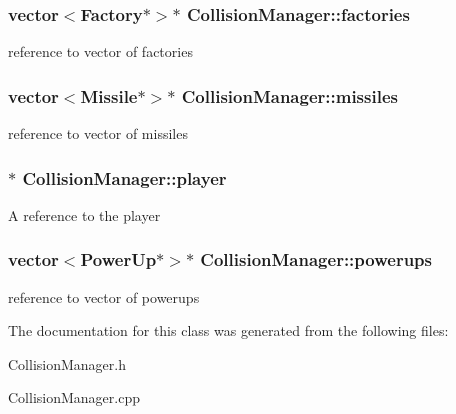 \subsubsection[{\texorpdfstring{factories}{factories}}]{\setlength{\rightskip}{0pt plus 5cm}vector$<${\bf Factory}$\ast$$>$$\ast$ Collision\+Manager\+::factories\hspace{0.3cm}{\ttfamily [private]}}\hypertarget{class_collision_manager_ad46ec3ec145aeacb4446ad42797964cd}{}\label{class_collision_manager_ad46ec3ec145aeacb4446ad42797964cd}
reference to vector of factories 
\subsubsection[{\texorpdfstring{missiles}{missiles}}]{\setlength{\rightskip}{0pt plus 5cm}vector$<${\bf Missile}$\ast$$>$$\ast$ Collision\+Manager\+::missiles\hspace{0.3cm}{\ttfamily [private]}}\hypertarget{class_collision_manager_a9d14346744bea49c6b45534dc7bf74fc}{}\label{class_collision_manager_a9d14346744bea49c6b45534dc7bf74fc}
reference to vector of missiles 
\subsubsection[{\texorpdfstring{player}{player}}]{$\ast$ Collision\+Manager\+::player}\hypertarget{class_collision_manager_aaa92cb687e2b743571212e2e3c9f86bf}{}\label{class_collision_manager_aaa92cb687e2b743571212e2e3c9f86bf}
A reference to the player 
\subsubsection[{\texorpdfstring{powerups}{powerups}}]{\setlength{\rightskip}{0pt plus 5cm}vector$<${\bf Power\+Up}$\ast$$>$$\ast$ Collision\+Manager\+::powerups\hspace{0.3cm}{\ttfamily [private]}}\hypertarget{class_collision_manager_a0e37f140934d53f752e758faddcea315}{}\label{class_collision_manager_a0e37f140934d53f752e758faddcea315}
reference to vector of powerups 

The documentation for this class was generated from the following files\+:\begin{DoxyCompactItemize}
\item 
Collision\+Manager.\+h\item 
Collision\+Manager.\+cpp\end{DoxyCompactItemize}
